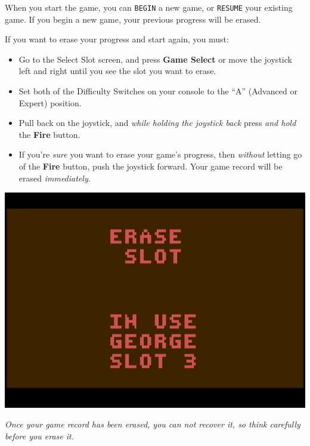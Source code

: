 \documentclass[10pt,twocolumn,openany,article]{memoir}
\begin{document}
When  you  start  the  game,  you can  \texttt{BEGIN}  a  new  game,  or
\texttt{RESUME}  your existing  game.  If  you begin  a  new game,  your
previous progress will be erased.

\else

If you want to erase your progress and start again, you must:

\begin{itemize}
\item Go  to the Select Slot  screen, and press \textbf{Game  Select} or
  move  the joystick  left and  right until  you see  the slot  you want
  to erase.
\item Set both  of the Difficulty Switches on your  console to the ``A''
  (Advanced or Expert) position.
\item Pull  back on the  joystick, and \emph{while holding  the joystick
    back} press \emph{and hold} the \textbf{Fire} button.
\item If you're \emph{sure} you want to erase your game's progress, then
  \emph{without}  letting  go  of  the \textbf{Fire}  button,  push  the
  joystick  forward. \ifdefined\DEMO  Your  game record  will be  erased
  \emph{immediately}. \fi
\end{itemize}

\begin{center}
  \includegraphics[width=\columnwidth]{../Manual/EraseSlotNTSC.png}
\end{center}

\ifdefined\DEMO

\emph{Once your game record has been  erased, you can not recover it, so
  think carefully before you erase it.}
\end{document}
